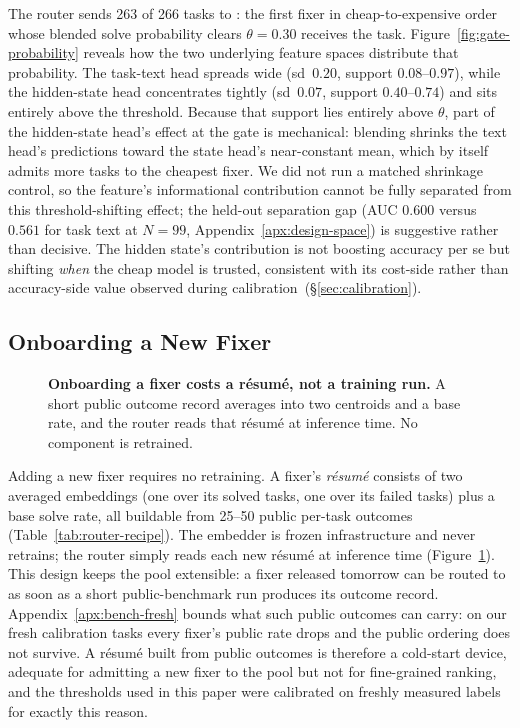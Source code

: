 The router sends 263 of 266 tasks to \fxkimi: the first fixer in
cheap-to-expensive order whose blended solve probability clears
$\theta{=}0.30$ receives the task.
Figure~\ref{fig:gate-probability} reveals how the two underlying feature
spaces distribute that probability.  The task-text head spreads wide
(sd~$0.20$, support $0.08$--$0.97$), while the hidden-state head
concentrates tightly (sd~$0.07$, support $0.40$--$0.74$) and sits
entirely above the threshold.
Because that support lies entirely above $\theta$, part of the
hidden-state head's effect at the gate is mechanical: blending shrinks
the text head's predictions toward the state head's near-constant mean,
which by itself admits more tasks to the cheapest fixer.  We did not
run a matched shrinkage control, so the feature's informational
contribution cannot be fully separated from this threshold-shifting
effect; the held-out separation gap (AUC $0.600$ versus $0.561$ for
task text at $N{=}99$, Appendix~\ref{apx:design-space}) is suggestive
rather than decisive.
The hidden state's contribution is not boosting accuracy per se but
shifting \emph{when} the cheap model is trusted, consistent with its
cost-side rather than accuracy-side value observed during
calibration~(\S\ref{sec:calibration}).

\FloatBarrier

\subsection{Onboarding a New Fixer}
\label{sec:results-onboarding}

\begin{figure}[!tbp]
\centering

\caption{\textbf{Onboarding a fixer costs a r\'esum\'e, not a training
run.} A short public outcome record averages into two centroids and a base
rate, and the router reads that r\'esum\'e at inference time. No component
is retrained.}
\label{fig:onboarding}
\end{figure}

Adding a new fixer requires no retraining.
A fixer's \emph{r\'esum\'e} consists of two averaged embeddings (one
over its solved tasks, one over its failed tasks) plus a base solve
rate, all buildable from 25--50 public per-task outcomes
(Table~\ref{tab:router-recipe}).
The embedder is frozen infrastructure and \modelname never retrains; the
router simply reads each new r\'esum\'e at inference time
(Figure~\ref{fig:onboarding}).
This design keeps the pool extensible: a fixer released tomorrow can be
routed to as soon as a short public-benchmark run produces its outcome
record.
Appendix~\ref{apx:bench-fresh} bounds what such public outcomes can
carry: on our fresh calibration tasks every fixer's public rate drops
and the public ordering does not survive.
A r\'esum\'e built from public outcomes is therefore a cold-start
device, adequate for admitting a new fixer to the pool but not for
fine-grained ranking, and the thresholds used in this paper were
calibrated on freshly measured labels for exactly this reason.

